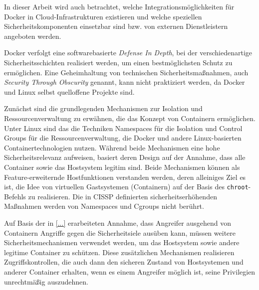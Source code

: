 \documentclass[../main.tex]{subfiles}
\begin{document}
    In dieser Arbeit wird auch betrachtet, welche Integrationsmöglichkeiten für Docker in Cloud-Infrastrukturen existieren und welche speziellen Sicherheitskomponenten einsetzbar sind bzw. von externen Dienstleistern angeboten werden.




  Docker verfolgt eine softwarebasierte \emph{Defense In Depth}, bei der verschiedenartige Sicherheitsschichten realisiert werden, um einen bestmöglichsten Schutz zu ermöglichen. Eine Geheimhaltung von technischen Sicherheitsmaßnahmen, auch \emph{Security Through Obscurity} genannt, kann nicht praktiziert werden, da Docker und Linux selbst quelloffene Projekte sind.

  Zunächst sind die grundlegenden Mechanismen zur Isolation und Ressourcenverwaltung zu erwähnen, die das Konzept von Containern ermöglichen. Unter Linux sind das die Techniken Namespaces für die Isolation und Control Groups für die Ressourcenverwaltung, die Docker und andere Linux-basierten Containertechnologien nutzen. Während beide Mechanismen eine hohe Sicherheitsrelevanz aufweisen, basiert deren Design auf der Annahme, dass alle Container sowie das Hostsystem legitim sind. Beide Mechanismen können als Feature-erweiternde Hostfunktionen verstanden werden, deren alleiniges Ziel es ist, die Idee von virtuellen Gastsystemen (Containern) auf der Basis des \texttt{chroot}-Befehls zu realisieren. Die in CISSP definierten sicherheitserhöhenden Maßnahmen werden von Namespaces und Cgroups nicht berührt.

  Auf Basis der in \ref{...} erarbeiteten Annahme, dass Angreifer ausgehend von Containern Angriffe gegen die Sicherheitsiele ausüben kann, müssen weitere Sicherheitsmechanismen verwendet werden, um das Hostsystem sowie andere legitime Container zu schützen. Diese zusätzlichen Mechanismen realisieren Zugriffskontrollen, die auch dann den sicheren Zustand von Hostsystemen und anderer Container erhalten, wenn es einem Angreifer möglich ist, seine Privilegien unrechtmäßig auszudehnen.

\end{document}
